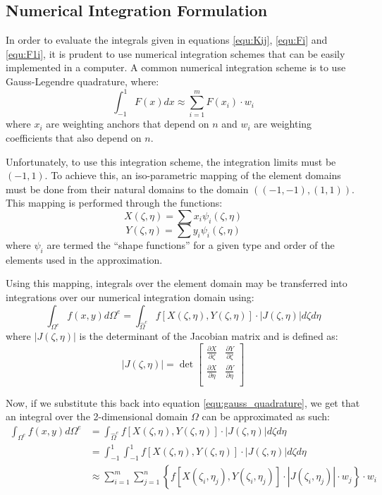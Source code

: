 \documentclass[letterpaper,10pt]{article}
\begin{document}
\subsection{Numerical Integration Formulation}
In order to evaluate the integrals given in equations \ref{equ:Kij}, \ref{equ:Fi} and \ref{equ:F1i}, it is prudent to use numerical integration schemes that can be easily implemented in a computer. A common numerical integration scheme is to use Gauss-Legendre quadrature, where:
\begin{equation}
\label{equ:gauss_quadrature}
\int_{-1}^1 F(x)dx \approx \sum_{i=1}^mF(x_i)\cdot w_i
\end{equation}
\noindent where $x_i$ are weighting anchors that depend on $n$ and $w_i$ are weighting coefficients that also depend on $n$.

Unfortunately, to use this integration scheme, the integration limits must be $(-1,1)$. To achieve this, an iso-parametric mapping of the element domains must be done from their natural domains to the domain $\left((-1,-1),(1,1)\right)$. This mapping is performed through the functions:
\[X(\zeta,\eta) = \sum x_i \psi_i(\zeta,\eta)\]
\[Y(\zeta,\eta) = \sum y_i \psi_i(\zeta,\eta)\]
\noindent where $\psi_i$ are termed the ``shape functions'' for a given type and order of the elements used in the approximation.

Using this mapping, integrals over the element domain may be transferred into integrations over our numerical integration domain using:
\[
\int_{\Omega^e} f(x,y)d\Omega^e = \int_{\hat{\Omega}^e}f\left[X(\zeta,\eta),Y(\zeta,\eta)\right]\cdot\left|J(\zeta,\eta)\right|d\zeta d\eta
\]
\noindent where $\left|J(\zeta,\eta)\right|$ is the determinant of the Jacobian matrix and is defined as:
\[
\left|J(\zeta,\eta)\right| = \det \left[\begin{array}{cc}
\frac{\partial X}{\partial \zeta} & \frac{\partial Y}{\partial \zeta} \\
\frac{\partial X}{\partial \eta} & \frac{\partial Y}{\partial \eta} \\
\end{array}\right]
\]

Now, if we substitute this back into equation \ref{equ:gauss_quadrature}, we get that an integral over the 2-dimensional domain $\Omega$ can be approximated as such:
\begin{equation}
\label{equ:numint}
\begin{split}
	\int_{\Omega^e} f(x,y)d\Omega^e &= \int_{\hat{\Omega}^e}f\left[X(\zeta,\eta),Y(\zeta,\eta)\right]\cdot\left|J(\zeta,\eta)\right|d\zeta d\eta \\
	&= \int_{-1}^{1}\int_{-1}^1f\left[X(\zeta,\eta),Y(\zeta,\eta)\right]\cdot\left|J(\zeta,\eta)\right|d\zeta d\eta \\
	&\approx \sum_{i=1}^m\sum_{j=1}^n\left\{f\left[X(\zeta_i,\eta_j),Y(\zeta_i,\eta_j)\right]\cdot\left|J(\zeta_i,\eta_j)\right| \cdot w_j \right\}\cdot w_i
\end{split}
\end{equation}
\end{document}
